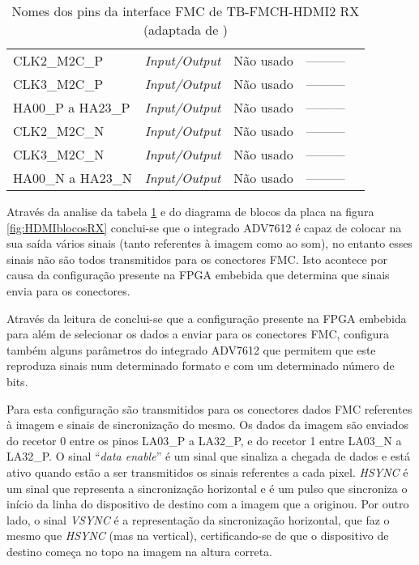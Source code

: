 \begin{table}[h!]
{\begin{tabular}{@{}lllll@{}}
			CLK2\_M2C\_P         & \textit{Input/Output}          & Não usado              & ---------                     \\ 
			CLK3\_M2C\_P         & \textit{Input/Output}          & Não usado              & ---------                     \\ 
			HA00\_P a HA23\_P    & \textit{Input/Output}          & Não usado              & ---------                     \\ 
			CLK2\_M2C\_N         & \textit{Input/Output}          & Não usado              & ---------                     \\ 
			CLK3\_M2C\_N         & \textit{Input/Output}          & Não usado              & ---------                     \\ 
			HA00\_N a HA23\_N    & \textit{Input/Output}          & Não usado              & ---------                     \\ \bottomrule	
		\end{tabular}}		
		\centering
		\caption[Nomes dos pins da interface FMC de TB-FMCH-HDMI2 RX]{Nomes dos pins da interface FMC de TB-FMCH-HDMI2 RX (adaptada de \cite{R009})}
		\label{table:HDMIdataRX}
	\end{table}

Através da analise da tabela \ref{table:HDMIdataRX} e do diagrama de blocos da placa na figura \ref{fig:HDMIblocosRX} conclui-se que o integrado ADV7612 é capaz de colocar na sua saída vários sinais (tanto referentes à imagem como ao som), no entanto esses sinais não são todos transmitidos para os conectores FMC. Isto acontece por causa da configuração presente na FPGA embebida que determina que sinais envia para os conectores. 

Através da leitura de \cite{R016} conclui-se que a configuração presente na FPGA embebida para além de selecionar os dados a enviar para os conectores FMC, configura também alguns parâmetros do integrado ADV7612 que permitem que este reproduza sinais num determinado formato e com um determinado número de bits. 

Para esta configuração são transmitidos para os conectores dados FMC referentes à imagem e sinais de sincronização do mesmo. Os dados da imagem são enviados do recetor 0 entre os pinos LA03\_P a LA32\_P, e do recetor 1  entre LA03\_N a LA32\_P. O sinal “\textit{data enable}” é um sinal que sinaliza a chegada de dados e está ativo quando estão a ser transmitidos os sinais referentes a cada pixel. \textit{HSYNC} é um sinal que representa a sincronização horizontal e é um pulso que sincroniza o início da linha do dispositivo de destino com a imagem que a originou. Por outro lado, o sinal \textit{VSYNC} é a representação da sincronização horizontal, que faz o mesmo que \textit{HSYNC} (mas na vertical), certificando-se de que o dispositivo de destino começa no topo na imagem na altura correta.

